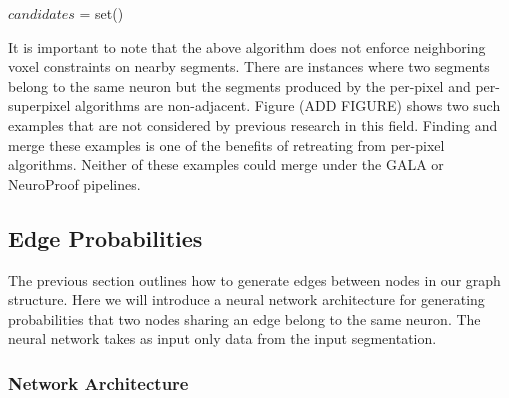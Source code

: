 	\begin{algorithmic}
				\State $candidates$ = set()
					
				\EndFor
			\EndFor
		\EndFunction
	\end{algorithmic}

It is important to note that the above algorithm does not enforce neighboring voxel constraints on nearby segments. There are instances where two segments belong to the same neuron but the segments produced by the per-pixel and per-superpixel algorithms are non-adjacent. Figure (ADD FIGURE) shows two such examples that are not considered by previous research in this field. Finding and merge these examples is one of the benefits of retreating from per-pixel algorithms. Neither of these examples could merge under the GALA or NeuroProof pipelines.

\subsection{Edge Probabilities}

The previous section outlines how to generate edges between nodes in our graph structure. Here we will introduce a neural network architecture for generating probabilities that two nodes sharing an edge belong to the same neuron. The neural network takes as input only data from the input segmentation. 

\subsubsection{Network Architecture}

